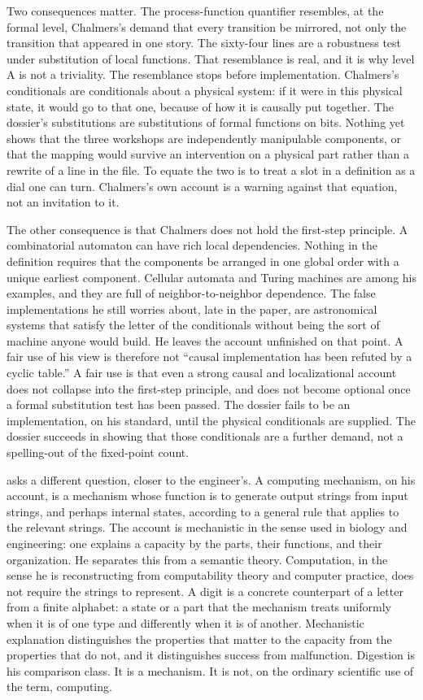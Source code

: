 \documentclass[11pt]{article}
\begin{document}
Two consequences matter. The process-function quantifier resembles, at the formal level, Chalmers’s demand that every transition be mirrored, not only the transition that appeared in one story. The sixty-four lines are a robustness test under substitution of local functions. That resemblance is real, and it is why level A is not a triviality. The resemblance stops before implementation. Chalmers’s conditionals are conditionals about a physical system: if it were in this physical state, it would go to that one, because of how it is causally put together. The dossier’s substitutions are substitutions of formal functions on bits. Nothing yet shows that the three workshops are independently manipulable components, or that the mapping would survive an intervention on a physical part rather than a rewrite of a line in the file. To equate the two is to treat a slot in a definition as a dial one can turn. Chalmers’s own account is a warning against that equation, not an invitation to it.

The other consequence is that Chalmers does not hold the first-step principle. A combinatorial automaton can have rich local dependencies. Nothing in the definition requires that the components be arranged in one global order with a unique earliest component. Cellular automata and Turing machines are among his examples, and they are full of neighbor-to-neighbor dependence. The false implementations he still worries about, late in the paper, are astronomical systems that satisfy the letter of the conditionals without being the sort of machine anyone would build. He leaves the account unfinished on that point. A fair use of his view is therefore not ``causal implementation has been refuted by a cyclic table.'' A fair use is that even a strong causal and localizational account does not collapse into the first-step principle, and does not become optional once a formal substitution test has been passed. The dossier fails to be an implementation, on his standard, until the physical conditionals are supplied. The dossier succeeds in showing that those conditionals are a further demand, not a spelling-out of the fixed-point count.

\citet{piccinini2007} asks a different question, closer to the engineer’s. A computing mechanism, on his account, is a mechanism whose function is to generate output strings from input strings, and perhaps internal states, according to a general rule that applies to the relevant strings. The account is mechanistic in the sense used in biology and engineering: one explains a capacity by the parts, their functions, and their organization. He separates this from a semantic theory. Computation, in the sense he is reconstructing from computability theory and computer practice, does not require the strings to represent. A digit is a concrete counterpart of a letter from a finite alphabet: a state or a part that the mechanism treats uniformly when it is of one type and differently when it is of another. Mechanistic explanation distinguishes the properties that matter to the capacity from the properties that do not, and it distinguishes success from malfunction. Digestion is his comparison class. It is a mechanism. It is not, on the ordinary scientific use of the term, computing.
\end{document}
